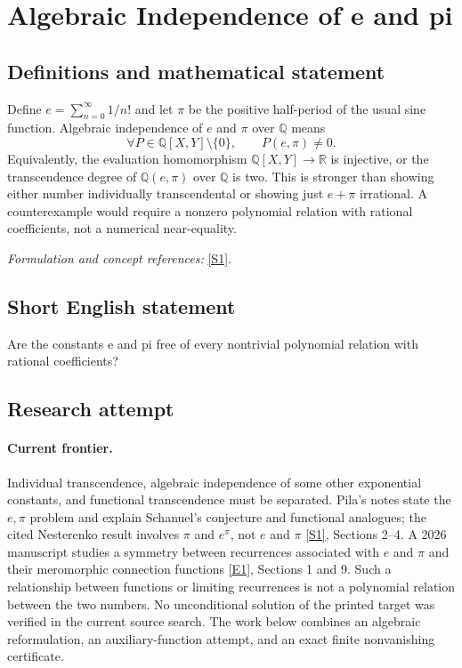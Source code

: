 \documentclass[11pt,a4paper]{article}
\newcommand{\Q}{\mathbb{Q}}
\newcommand{\R}{\mathbb{R}}
\newcommand{\sref}[2]{\hyperlink{source:#1:#2}{[S#2]}}
\newcommand{\eref}[2]{\hyperlink{extra:#1:#2}{[E#2]}}
\newif\ifshowcatalogue
\newcommand{\cataloguescope}[1]{\ifshowcatalogue
 \paragraph{Exact scope in the supplied catalogue.}
 \begin{quote}\small #1\end{quote}\fi}
\numberwithin{equation}{section}
\begin{document}
\setcounter{section}{167}
\clearpage
\section{\texorpdfstring{Algebraic Independence of e and pi}{Algebraic Independence of e and pi}}\label{168}
\subsection{Definitions and mathematical statement}
Define $e=\sum_{n=0}^{\infty}1/n!$ and let $\pi$ be the positive half-period of the usual sine function. Algebraic independence of $e$ and $\pi$ over $\Q$ means
\[
 \forall P\in\Q[X,Y]\setminus\{0\},\qquad P(e,\pi)\ne0.
\]
Equivalently, the evaluation homomorphism $\Q[X,Y]\to\R$ is injective, or the transcendence degree of $\Q(e,\pi)$ over $\Q$ is two. This is stronger than showing either number individually transcendental or showing just $e+\pi$ irrational. A counterexample would require a nonzero polynomial relation with rational coefficients, not a numerical near-equality.
\par\smallskip\textit{Formulation and concept references:} \sref{168}{1}.
\cataloguescope{Prove that no nonzero polynomial P in Q[X,Y] satisfies P(e,pi)=0.}
\subsection{Short English statement}
Are the constants e and pi free of every nontrivial polynomial relation with rational coefficients?
\subsection{Research attempt}

\paragraph{Current frontier.}
Individual transcendence, algebraic independence of some other
exponential constants, and functional transcendence must be separated.
Pila's notes state the $e,\pi$ problem and explain Schanuel's conjecture
and functional analogues; the cited Nesterenko result involves
$\pi$ and $e^\pi$, not $e$ and $\pi$ \sref{168}{1}, Sections 2--4.
A 2026 manuscript studies a symmetry between recurrences associated
with $e$ and $\pi$ and their meromorphic connection functions
\eref{168}{1}, Sections 1 and 9. Such a relationship between functions
or limiting recurrences is not a polynomial relation between the two
numbers. No unconditional solution of the printed target was verified
in the current source search. The work below combines an algebraic
reformulation, an auxiliary-function attempt, and an exact finite
nonvanishing certificate.
\end{document}
